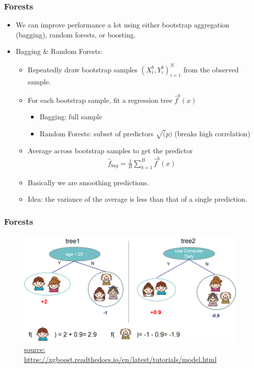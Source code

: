 \documentclass[
  shownotes,
  xcolor={svgnames},
  hyperref={colorlinks,citecolor=DarkBlue,linkcolor=DarkRed,urlcolor=DarkBlue}
  , aspectratio=169]{beamer}
\begin{document}
\begin{frame}[fragile]
\frametitle{ Forests }


\begin{itemize}
  \item We can improve performance a lot using either bootstrap aggregation (bagging), random forests, or boosting.
  \item Bagging \& Random Forests:
    \begin{itemize}
      \item Repeatedly draw bootstrap samples $(X_i^b,Y_i^b)_{i=1}^N$ from the observed sample.
      \item For each bootstrap sample, fit a regression tree $\hat{f}^b(x)$
      \begin{itemize}
        \item Bagging: full sample
        \item Random Forests: subset of predictors $ \sqrt(p)$ (breaks high correlation)
      \end{itemize}
      \item Average across bootstrap samples to get the predictor
      \begin{align}
        \hat{f}_{bag} =\frac{1}{B}\sum_{b=1}^B \hat{f}^b(x)
      \end{align}
\item Basically we are smoothing predictions. 
\item Idea: the variance of the average is less than that of a single prediction.
\end{itemize}

\end{itemize}


\end{frame}
\begin{frame}[fragile]
\frametitle{ Forests }

\begin{figure}[H] \centering
            \captionsetup{justification=centering}
              \includegraphics[scale=0.5]{figures/twocart.png}
              \\
              \tiny
              \url{source: https://xgboost.readthedocs.io/en/latest/tutorials/model.html}
 \end{figure}



\end{frame}
\end{document}
